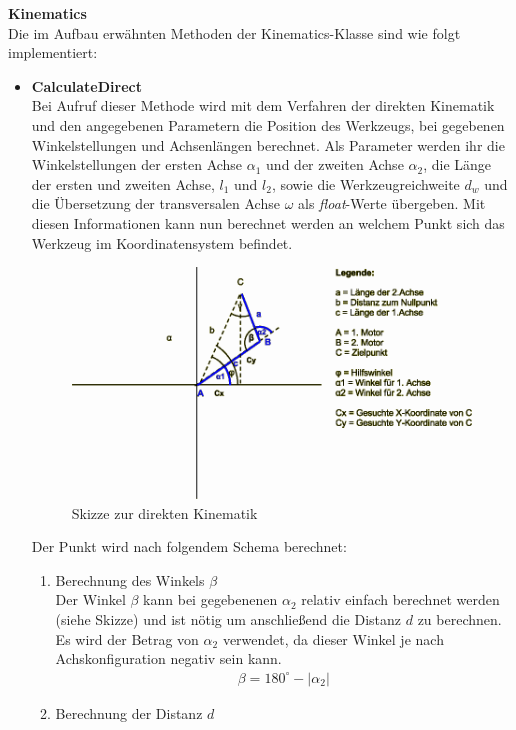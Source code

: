 \textbf{Kinematics}\\
Die im Aufbau erwähnten Methoden der Kinematics-Klasse sind wie folgt implementiert:
\begin{itemize}
\item \textbf{CalculateDirect}\\
Bei Aufruf dieser Methode wird mit dem Verfahren der direkten Kinematik und den angegebenen Parametern die Position des Werkzeugs, bei gegebenen Winkelstellungen und Achsenlängen berechnet. Als Parameter werden ihr die Winkelstellungen der ersten Achse $\alpha_1$ und der zweiten Achse $\alpha_2$, die Länge der ersten und zweiten Achse, $l_1$ und $l_2$, sowie die Werkzeugreichweite $d_w$ und die Übersetzung der transversalen Achse $\omega$ als \textit{float}-Werte übergeben. Mit diesen Informationen kann nun berechnet werden an welchem Punkt sich das Werkzeug im Koordinatensystem befindet.
\begin{figure}[H]
  \centering
  \begin{minipage}[t]{12 cm}
  	\centering
  	\includegraphics[width=12cm]{images/Direktkinematik} 
    \caption{Skizze zur direkten Kinematik}
  \end{minipage}
\end{figure}
\newpage
Der Punkt wird nach folgendem Schema berechnet:
\begin{enumerate}
\item Berechnung des Winkels $\beta$\\
Der Winkel $\beta$ kann bei gegebenenen $\alpha_2$ relativ einfach berechnet werden (siehe Skizze) und ist nötig um anschließend die Distanz $d$ zu berechnen. Es wird der Betrag von $\alpha_2$ verwendet, da dieser Winkel je nach Achskonfiguration negativ sein kann.
\begin{align*}
\beta = 180^\circ - |\alpha_2|
\end{align*}
\item Berechnung der Distanz $d$\\

\end{enumerate}
\end{itemize}
